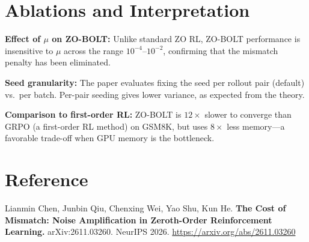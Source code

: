 \documentclass[10pt,twocolumn]{article}
\begin{document}
\section{Ablations and Interpretation}

\textbf{Effect of $\mu$ on ZO-BOLT:} Unlike standard ZO RL, ZO-BOLT
performance is insensitive to $\mu$ across the range $10^{-4}$--$10^{-2}$,
confirming that the mismatch penalty has been eliminated.

\textbf{Seed granularity:} The paper evaluates fixing the seed per
rollout pair (default) vs.\ per batch. Per-pair seeding gives lower
variance, as expected from the theory.

\textbf{Comparison to first-order RL:} ZO-BOLT is $12\times$ slower
to converge than GRPO (a first-order RL method) on GSM8K, but uses
$8\times$ less memory---a favorable trade-off when GPU memory is the
bottleneck.

\section*{Reference}

Lianmin Chen, Junbin Qiu, Chenxing Wei, Yao Shu, Kun He.
\textbf{The Cost of Mismatch: Noise Amplification in Zeroth-Order
Reinforcement Learning.}
arXiv:2611.03260. NeurIPS 2026.
\url{https://arxiv.org/abs/2611.03260}
\end{document}
